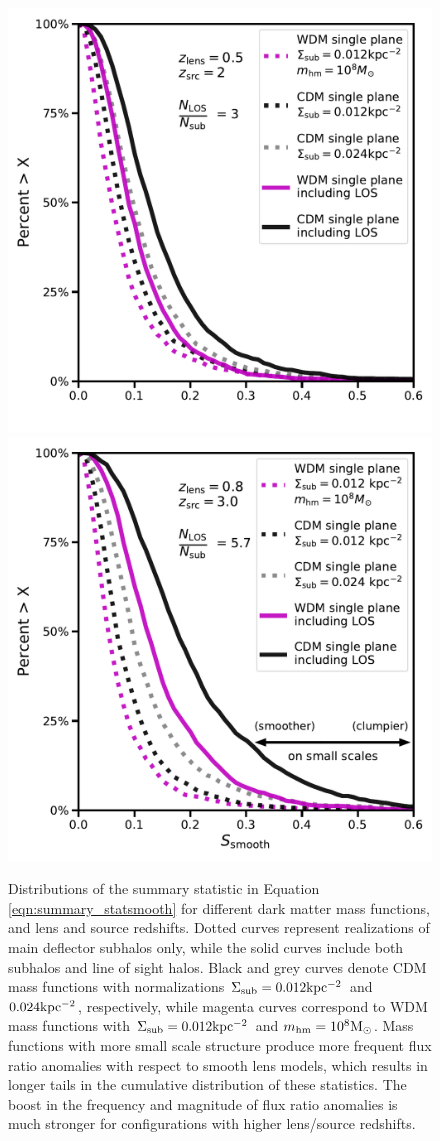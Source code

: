 \begin{figure}
	\includegraphics[clip,trim=0cm 0cm 0cm
	0cm,width=.48\textwidth,keepaspectratio]{./figures_LOSforward/fluxratio_distributions_zclose.pdf}
	\includegraphics[clip,trim=0cm 0cm 0cm
	0cm,width=.48\textwidth,keepaspectratio]{./figures_LOSforward/fluxratio_distributions_zfar.pdf}
	\caption{\label{fig:fluxdistributions} Distributions of the summary statistic in Equation \ref{eqn:summary_statsmooth} for different dark matter mass functions, and lens and source redshifts. Dotted curves represent realizations of main deflector subhalos only, while the solid curves include both subhalos and line of sight halos. Black and grey curves denote CDM mass functions with normalizations $\Sigma_{\rm{sub}} = 0.012 \rm{kpc^{-2}}$ and $0.024 \rm{kpc^{-2}}$, respectively, while magenta curves correspond to WDM mass functions with $\Sigma_{\rm{sub}} = 0.012 \rm{kpc^{-2}}$ and ${m_{\rm{hm}}} = 10^{8} {\rm{M}_{\odot}}$. Mass functions with more small scale structure produce more frequent flux ratio anomalies with respect to smooth lens models, which results in longer tails in the cumulative distribution of these statistics. The boost in the frequency and magnitude of flux ratio anomalies is much stronger for configurations with higher lens/source redshifts.}
\end{figure}

